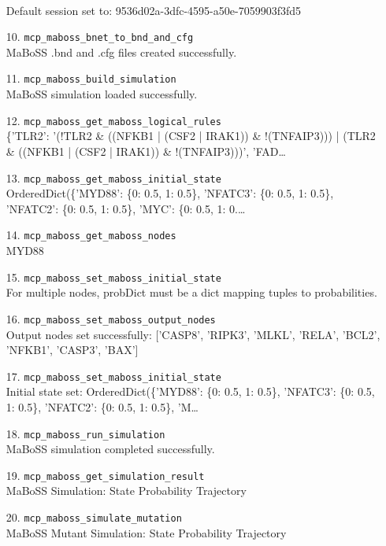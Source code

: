 \begin{enumerate}
\hfill\\
\RaggedRight Default session set to: 9536d02a-3dfc-4595-a50e-7059903f3fd5
\item[10.] \texttt{mcp\_\allowbreak{}maboss\_\allowbreak{}bnet\_\allowbreak{}to\_\allowbreak{}bnd\_\allowbreak{}and\_\allowbreak{}cfg}
\hfill\\
\RaggedRight MaBoSS .bnd and .cfg files created successfully.
\item[11.] \texttt{mcp\_\allowbreak{}maboss\_\allowbreak{}build\_\allowbreak{}simulation}
\hfill\\
\RaggedRight MaBoSS simulation loaded successfully.
\item[12.] \texttt{mcp\_\allowbreak{}maboss\_\allowbreak{}get\_\allowbreak{}maboss\_\allowbreak{}logical\_\allowbreak{}rules}
\hfill\\
\RaggedRight \{'TLR2': '(!TLR2 \& ((NFKB1 | (CSF2 | IRAK1)) \& !(TNFAIP3))) | (TLR2 \& ((NFKB1 | (CSF2 | IRAK1)) \& !(TNFAIP3)))', 'FAD\ldots{}
\item[13.] \texttt{mcp\_\allowbreak{}maboss\_\allowbreak{}get\_\allowbreak{}maboss\_\allowbreak{}initial\_\allowbreak{}state}
\hfill\\
\RaggedRight OrderedDict(\{'MYD88': \{0: 0.5, 1: 0.5\}, 'NFATC3': \{0: 0.5, 1: 0.5\}, 'NFATC2': \{0: 0.5, 1: 0.5\}, 'MYC': \{0: 0.5, 1: 0.\ldots{}
\item[14.] \texttt{mcp\_\allowbreak{}maboss\_\allowbreak{}get\_\allowbreak{}maboss\_\allowbreak{}nodes}
\hfill\\
\RaggedRight MYD88
\item[15.] \texttt{mcp\_\allowbreak{}maboss\_\allowbreak{}set\_\allowbreak{}maboss\_\allowbreak{}initial\_\allowbreak{}state}
\hfill\\
\RaggedRight For multiple nodes, probDict must be a dict mapping tuples to probabilities.
\item[16.] \texttt{mcp\_\allowbreak{}maboss\_\allowbreak{}set\_\allowbreak{}maboss\_\allowbreak{}output\_\allowbreak{}nodes}
\hfill\\
\RaggedRight Output nodes set successfully: ['CASP8', 'RIPK3', 'MLKL', 'RELA', 'BCL2', 'NFKB1', 'CASP3', 'BAX']
\item[17.] \texttt{mcp\_\allowbreak{}maboss\_\allowbreak{}set\_\allowbreak{}maboss\_\allowbreak{}initial\_\allowbreak{}state}
\hfill\\
\RaggedRight Initial state set: OrderedDict(\{'MYD88': \{0: 0.5, 1: 0.5\}, 'NFATC3': \{0: 0.5, 1: 0.5\}, 'NFATC2': \{0: 0.5, 1: 0.5\}, 'M\ldots{}
\item[18.] \texttt{mcp\_\allowbreak{}maboss\_\allowbreak{}run\_\allowbreak{}simulation}
\hfill\\
\RaggedRight MaBoSS simulation completed successfully.
\item[19.] \texttt{mcp\_\allowbreak{}maboss\_\allowbreak{}get\_\allowbreak{}simulation\_\allowbreak{}result}
\hfill\\
\RaggedRight MaBoSS Simulation: State Probability Trajectory
\item[20.] \texttt{mcp\_\allowbreak{}maboss\_\allowbreak{}simulate\_\allowbreak{}mutation}
\hfill\\
\RaggedRight MaBoSS Mutant Simulation: State Probability Trajectory
\end{enumerate}

